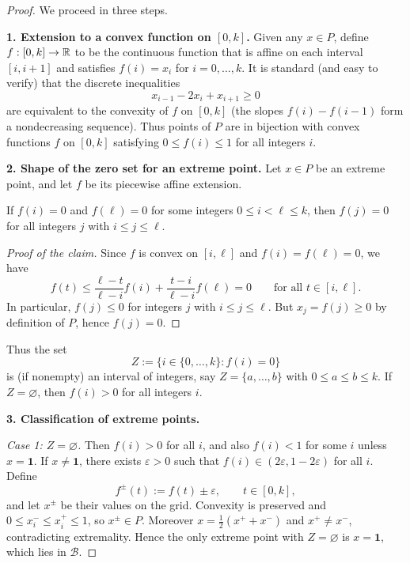 \begin{proof}
    We proceed in three steps.

    \smallskip
    \noindent\textbf{1. Extension to a convex function on $[0,k]$.}
    Given any $x\in P$, define $f:[0,k]\to\mathbb{R}$ to be the continuous function that is affine on each interval $[i,i+1]$ and satisfies $f(i)=x_i$ for $i=0,\dots,k$.
    It is standard (and easy to verify) that the discrete inequalities
    \[
        x_{i-1}-2x_i+x_{i+1}\ge0
    \]
    are equivalent to the convexity of $f$ on $[0,k]$ (the slopes $f(i)-f(i-1)$ form a nondecreasing sequence).
    Thus points of $P$ are in bijection with convex functions $f$ on $[0,k]$ satisfying $0\le f(i)\le1$ for all integers $i$.

    \smallskip
    \noindent\textbf{2. Shape of the zero set for an extreme point.}
    Let $x\in P$ be an extreme point, and let $f$ be its piecewise affine extension.

    \begin{claim}
        If $f(i)=0$ and $f(\ell)=0$ for some integers $0\le i<\ell\le k$, then $f(j)=0$ for all integers $j$ with $i\le j\le \ell$.
    \end{claim}

    \begin{proof}[Proof of the claim]
        Since $f$ is convex on $[i,\ell]$ and $f(i)=f(\ell)=0$, we have
        \[
            f(t)\le \frac{\ell-t}{\ell-i}f(i)+\frac{t-i}{\ell-i}f(\ell)=0
            \qquad\text{for all }t\in[i,\ell].
        \]
        In particular, $f(j)\le0$ for integers $j$ with $i\le j\le \ell$.
        But $x_j=f(j)\ge0$ by definition of $P$, hence $f(j)=0$.
    \end{proof}

    Thus the set
    \[
        Z:=\{i\in\{0,\dots,k\}: f(i)=0\}
    \]
    is (if nonempty) an interval of integers, say $Z=\{a,\dots,b\}$ with $0\le a\le b\le k$.
    If $Z=\varnothing$, then $f(i)>0$ for all integers $i$.

    \smallskip
    \noindent\textbf{3. Classification of extreme points.}

    \smallskip
    \emph{Case 1: $Z=\varnothing$.}
    Then $f(i)>0$ for all $i$, and also $f(i)<1$ for some $i$ unless $x=\mathbf{1}$.
    If $x\neq\mathbf{1}$, there exists $\varepsilon>0$ such that $f(i)\in(2\varepsilon,1-2\varepsilon)$ for all $i$.
    Define
    \[
        f^{\pm}(t):=f(t)\pm\varepsilon,\qquad t\in[0,k],
    \]
    and let $x^{\pm}$ be their values on the grid.
    Convexity is preserved and $0\le x_i^{-}\le x_i^{+}\le1$, so $x^{\pm}\in P$.
    Moreover $x=\frac12(x^{+}+x^{-})$ and $x^{+}\neq x^{-}$, contradicting extremality.
    Hence the only extreme point with $Z=\varnothing$ is $x=\mathbf{1}$, which lies in $\mathcal{B}$.


\end{proof}

